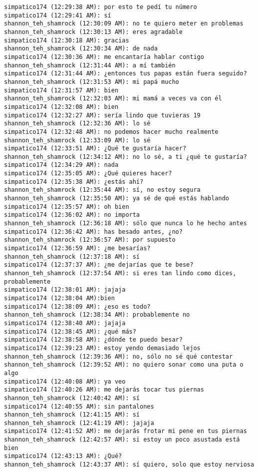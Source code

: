 \begin{verbatim}
simpatico174 (12:29:38 AM): por esto te pedí tu número
simpatico174 (12:29:41 AM): sí
shannon_teh_shamrock (12:30:09 AM): no te quiero meter en problemas
shannon_teh_shamrock (12:30:13 AM): eres agradable
simpatico174 (12:30:18 AM): gracias
shannon_teh_shamrock (12:30:34 AM): de nada
simpatico174 (12:30:36 AM): me encantaría hablar contigo
shannon_teh_shamrock (12:31:44 AM): a mí también
simpatico174 (12:31:44 AM): ¿entonces tus papas están fuera seguido?
shannon_teh_shamrock (12:31:53 AM): mi papá mucho
simpatico174 (12:31:57 AM): bien
shannon_teh_shamrock (12:32:03 AM): mi mamá a veces va con él
simpatico174 (12:32:08 AM): bien
simpatico174 (12:32:27 AM): sería lindo que tuvieras 19
shannon_teh_shamrock (12:32:36 AM): lo sé
simpatico174 (12:32:48 AM): no podemos hacer mucho realmente
shannon_teh_shamrock (12:33:09 AM): lo sé
simpatico174 (12:33:51 AM): ¿Qué te gustaría hacer?
shannon_teh_shamrock (12:34:12 AM): no lo sé, a ti ¿qué te gustaría?
simpatico174 (12:34:29 AM): nada
simpatico174 (12:35:05 AM): ¿Qué quieres hacer?
simpatico174 (12:35:38 AM): ¿estás ahí?
shannon_teh_shamrock (12:35:44 AM): sí, no estoy segura
shannon_teh_shamrock (12:35:50 AM): ya sé de qué estás hablando
simpatico174 (12:35:57 AM): oh bien
simpatico174 (12:36:02 AM): no importa
shannon_teh_shamrock (12:36:18 AM): sólo que nunca lo he hecho antes
simpatico174 (12:36:42 AM): has besado antes, ¿no?
shannon_teh_shamrock (12:36:57 AM): por supuesto
simpatico174 (12:36:59 AM): ¿me besarías?
shannon_teh_shamrock (12:37:18 AM): sí
simpatico174 (12:37:37 AM): ¿me dejarías que te bese?
shannon_teh_shamrock (12:37:54 AM): si eres tan lindo como dices, probablemente
simpatico174 (12:38:01 AM): jajaja
simpatico174 (12:38:04 AM):bien
simpatico174 (12:38:09 AM): ¿eso es todo?
shannon_teh_shamrock (12:38:34 AM): probablemente no
simpatico174 (12:38:40 AM): jajaja
simpatico174 (12:38:45 AM): ¿qué más?
simpatico174 (12:38:58 AM): ¿dónde te puedo besar?
simpatico174 (12:39:23 AM): estoy yendo demasiado lejos
shannon_teh_shamrock (12:39:36 AM): no, sólo no sé qué contestar
shannon_teh_shamrock (12:39:52 AM): no quiero sonar como una puta o algo
simpatico174 (12:40:08 AM): ya veo
simpatico174 (12:40:26 AM): me dejarás tocar tus piernas
shannon_teh_shamrock (12:40:42 AM): sí
simpatico174 (12:40:55 AM): sin pantalones
shannon_teh_shamrock (12:41:15 AM): sí
shannon_teh_shamrock (12:41:19 AM): jajaja
simpatico174 (12:41:52 AM): me dejarás frotar mi pene en tus piernas
shannon_teh_shamrock (12:42:57 AM): si estoy un poco asustada está bien 
simpatico174 (12:43:13 AM): ¿Qué?
shannon_teh_shamrock (12:43:37 AM): sí quiero, solo que estoy nerviosa

\end{verbatim}
